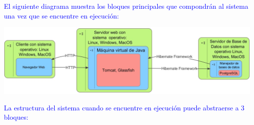 \documentclass[11pt,letterpaper,titlepage]{article}
\begin{document}
\textcolor{blue}{El siguiente diagrama muestra los bloques principales que compondr\'an al sistema una vez que se encuentre en ejecuci\'on:}

\begin{center} 
\includegraphics[width=440pt]{arq2.png}
\end{center}
\textcolor{blue}{La estructura del sistema cuando se encuentre en ejecuci\'on puede abstraerse a 3 bloques:}
\end{document}
